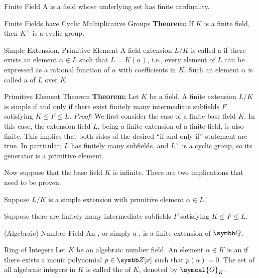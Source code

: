 \begin{dfnbox}{Finite Field}
	A  is a field whose underlying set has finite cardinality.
\end{dfnbox}

\begin{thmbox}{Finite Fields have Cyclic Multiplicative Groups}
	\textbf{Theorem:} If $K$ is a finite field, then $K^\times$ is a cyclic group.
\end{thmbox}

\begin{dfnbox}{Simple Extension, Primitive Element}
	A field extension $L/K$ is called a  if there exists an element $\alpha \in L$ such that $L = K(\alpha)$, i.e., every element of $L$ can be expressed as a rational function of $\alpha$ with coefficients in $K$. Such an element $\alpha$ is called a  of $L$ over $K$.
\end{dfnbox}

\begin{thmbox}{Primitive Element Theorem}
	\textbf{Theorem:} Let $K$ be a field. A finite extension $L/K$ is simple if and only if there exist finitely many intermediate subfields $F$ satisfying $K \le F \le L$.
\tcblower
	\textit{Proof:} We first consider the case of a finite base field $K$. In this case, the extension field $L$, being a finite extension of a finite field, is also finite. This implies that both sides of the desired ``if and only if'' statement are true. In particular, $L$ has finitely many subfields, and $L^\times$ is a cyclic group, so its generator is a primitive element.

	Now suppose that the base field $K$ is infinite. There are two implications that need to be proven.
	\begin{dfnitems}
		\item Suppose $L/K$ is a simple extension with primitive element $\alpha \in L$,
		\item Suppose there are finitely many intermediate subfields $F$ satisfying $K \le F \le L$.
	\end{dfnitems}
\end{thmbox}

\begin{dfnbox}{(Algebraic) Number Field}
	An , or simply a , is a finite extension of $\Q$.
\end{dfnbox}

\begin{dfnbox}{Ring of Integers}
	Let $K$ be an algebraic number field. An element $\alpha \in K$ is an  if there exists a monic polynomial $p \in \Z[x]$ such that $p(\alpha) = 0$. The set of all algebraic integers in $K$ is called the  of $K$, denoted by $\symcal{O}_K$.
\end{dfnbox}
